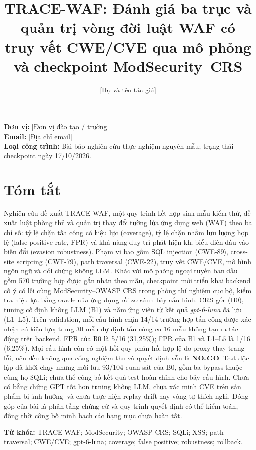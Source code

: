\documentclass[
  10pt,
  a4paper,
]{article}
\title{TRACE-WAF: Đánh giá ba trục và quản trị vòng đời luật WAF có truy
vết CWE/CVE qua mô phỏng và checkpoint ModSecurity--CRS}
\author{{[}Họ và tên tác giả{]}}
\date{}
\makeatletter
\renewcommand{\maketitle}{%
  \begin{center}%
  {\fontsize{14}{16}\selectfont\bfseries\@title\par}%
  \vspace{0.6em}%
  {\fontsize{10}{12}\selectfont\@author\par}%
  \end{center}\vspace{1em}%
}
\makeatother
\begin{document}
\maketitle

\textbf{Đơn vị:} {[}Đơn vị đào tạo / trường{]}\\
\textbf{Email:} {[}Địa chỉ email{]}\\
\textbf{Loại công trình:} Bài báo nghiên cứu thực nghiệm nguyên mẫu;
trạng thái checkpoint ngày 17/10/2026.

\section{Tóm tắt}\label{tuxf3m-tux1eaft}

Nghiên cứu đề xuất TRACE-WAF, một quy trình kết hợp sinh mẫu kiểm thử,
đề xuất luật phòng thủ và quản trị thay đổi tường lửa ứng dụng web (WAF)
theo ba chỉ số: tỷ lệ chặn tấn công có hiệu lực (coverage), tỷ lệ chặn
nhầm lưu lượng hợp lệ (false-positive rate, FPR) và khả năng duy trì
phát hiện khi biểu diễn đầu vào biến đổi (evasion robustness). Phạm vi
bao gồm SQL injection (CWE-89), cross-site scripting (CWE-79), path
traversal (CWE-22), truy vết CWE/CVE, mô hình ngôn ngữ và đối chứng
không LLM. Khác với mô phỏng ngoại tuyến ban đầu gồm 570 trường hợp được
gắn nhãn theo mẫu, checkpoint mới triển khai backend cố ý có lỗi cùng
ModSecurity--OWASP CRS trong phòng thí nghiệm cục bộ, kiểm tra hiệu lực
bằng oracle của ứng dụng rồi so sánh bảy cấu hình: CRS gốc (B0), tuning
cố định không LLM (B1) và năm ứng viên từ kết quả \emph{gpt-6-luna} đã
lưu (L1--L5). Trên validation, mỗi cấu hình chặn 14/14 trường hợp tấn
công được xác nhận có hiệu lực; trong 30 mẫu dự định tấn công có 16 mẫu
không tạo ra tác động trên backend. FPR của B0 là 5/16 (31,25\%); FPR
của B1 và L1--L5 là 1/16 (6,25\%). Mọi cấu hình còn có một hồi quy phản
hồi hợp lệ do proxy thay trang lỗi, nên đều không qua cổng nghiệm thu và
quyết định vẫn là \textbf{NO-GO}. Test độc lập đã khởi chạy nhưng mới
lưu 93/104 quan sát của B0, gồm ba bypass thuộc cùng họ SQLi; chưa thể
công bố kết quả test hoàn chỉnh cho bảy cấu hình. Chưa có bằng chứng GPT
tốt hơn tuning không LLM, chưa xác minh CVE trên sản phẩm bị ảnh hưởng,
và chưa thực hiện replay drift hay vòng tự thích nghi. Đóng góp của bài
là phân tầng chứng cứ và quy trình quyết định có thể kiểm toán, đồng
thời công bố minh bạch các hạng mục chưa hoàn tất.

\textbf{Từ khóa:} TRACE-WAF; ModSecurity; OWASP CRS; SQLi; XSS; path
traversal; CWE/CVE; gpt-6-luna; coverage; false positive; robustness;
rollback.
\end{document}
